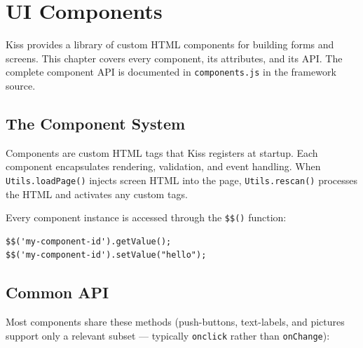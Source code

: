 \chapter{UI Components}
\label{ch:components}

Kiss provides a library of custom HTML components for building forms and screens.  This chapter covers every component, its attributes, and its API.  The complete component API is documented in \texttt{components.js} in the framework source.

\section{The Component System}
\label{sec:comp-system}

Components are custom HTML tags that Kiss registers at startup.  Each component encapsulates rendering, validation, and event handling.  When \texttt{Utils.loadPage()} injects screen HTML into the page, \texttt{Utils.rescan()} processes the HTML and activates any custom tags.

Every component instance is accessed through the \texttt{\$\$()} function:

\begin{lstlisting}[style=javascript]
$$('my-component-id').getValue();
$$('my-component-id').setValue("hello");
\end{lstlisting}

\section{Common API}
\label{sec:comp-common}

Most components share these methods (push-buttons, text-labels, and pictures support only a relevant subset --- typically \texttt{onclick} rather than \texttt{onChange}):

